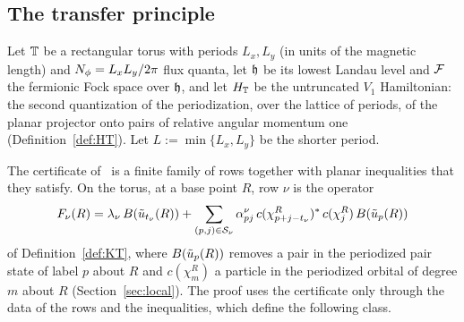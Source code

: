 \subsection{The transfer principle}\label{ssec:transfer}

Let $\mathbb{T}$ be a rectangular torus with periods $L_x,L_y$ (in units of the magnetic length) and $N_{\phi}=L_xL_y/2\pi$ flux quanta,
let $\mathfrak{h}$ be its lowest Landau level and $\mathcal{F}$ the fermionic Fock space over $\mathfrak{h}$, and let $H_{\mathbb{T}}$ be the untruncated $V_1$
Hamiltonian: the second quantization of the periodization, over the lattice of periods, of the planar projector onto pairs of
relative angular momentum one (Definition~\ref{def:HT}). Let $L:=\min\{L_x,L_y\}$ be the shorter period.

The certificate of~\cite{OAI:A-Fock-space-inequality-and-the-Laughlin-spectral-gap-September-24-2026} is a finite family of rows
together with planar inequalities that they satisfy. On the torus, at a base point $R$, row $\nu$ is the operator
\[
F_\nu(R)=\lambda_\nu\,B(\tilde u_{t_\nu}(R))+\sum_{(p,j)\in\mathcal S_\nu}\alpha^\nu_{pj}\,c(\chi^R_{p+j-t_\nu})^*\,c(\chi_j^R)\,B(\tilde u_p(R))
\]
of Definition~\ref{def:KT}, where $B(\tilde u_p(R))$ removes a pair in the periodized pair state of label $p$ about $R$ and $c(\chi^R_m)$ a
particle in the periodized orbital of degree $m$ about $R$ (Section~\ref{sec:local}). The proof uses the certificate only through
the data of the rows and the inequalities, which define the following class.

